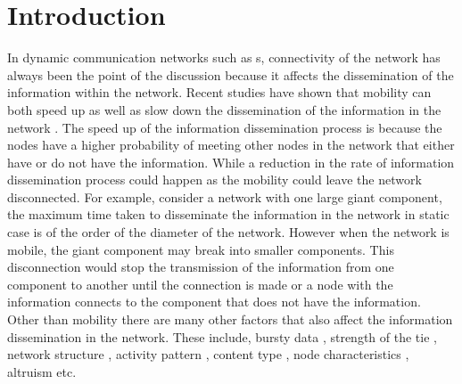 \documentclass[preprint, twocolumn,5p]{elsarticle}
\begin{document}
\section{Introduction}\label{sec:introduction}

In dynamic communication networks such as s, connectivity of the network has always been the point of the discussion because it affects the dissemination of the information within the network. Recent studies have shown that mobility can both speed up as well as slow down the dissemination of the information in the network \cite{Kivela2012}. The speed up of the information dissemination process is because the nodes have a higher probability of meeting other nodes in the network that either have or do not have the information. While a reduction in the rate of information dissemination process could happen as the mobility could leave the network disconnected. For example, consider a network with one large giant component, the maximum time taken to disseminate the information in the network in static case is of the order of the diameter of the network. However when the network is mobile, the giant component may break into smaller components. This disconnection would stop the transmission of the information from one component to another until the connection is made or a node with the information connects to the component that does not have the information. Other than mobility there are many other factors that also affect the information dissemination in the network. These include, bursty data \cite{Karsai2011}, strength of the tie \cite{Miritello2011}, network structure \cite{Nicosia2011}, activity pattern \cite{Vazquez2007}, content type \cite{Wang2009}, node characteristics \cite{Wang2011a}, altruism \cite{Hui2009} etc.
\end{document}
